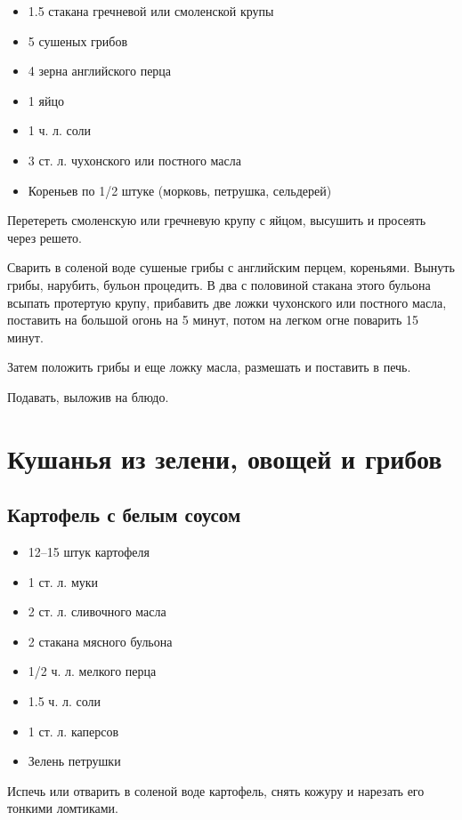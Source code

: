 \begin{itemize}
	\item 1.5 стакана гречневой или смоленской крупы 
    \item 5 сушеных грибов 
    \item 4 зерна английского перца
    \item 1 яйцо 
    \item 1 ч. л. соли 
    \item 3 ст. л. чухонского или постного масла 
    \item Кореньев по 1/2 штуке (морковь, петрушка, сельдерей)
\end{itemize}

Перетереть смоленскую или гречневую крупу с яйцом, высушить и просеять через решето.

Сварить в соленой воде сушеные грибы с английским перцем, кореньями. Вынуть грибы, нарубить, бульон процедить. В два с половиной стакана этого бульона всыпать протертую крупу, прибавить две ложки чухонского или постного масла, поставить на большой огонь на 5 минут, потом на легком огне поварить 15 минут.

Затем положить грибы и еще ложку масла, размешать и поставить в печь.

Подавать, выложив на блюдо.

\newpage
\section{Кушанья из зелени, овощей и грибов}\label{15sec:ovoschi}

\subsection{Картофель с белым соусом}

\begin{itemize}
	\item 12–15 штук картофеля 
    \item 1 ст. л. муки
    \item 2 ст. л. сливочного масла 
    \item 2 стакана мясного бульона 
    \item 1/2 ч. л. мелкого перца
    \item 1.5 ч. л. соли 
    \item 1 ст. л. каперсов 
    \item Зелень петрушки
\end{itemize}

Испечь или отварить в соленой воде картофель, снять кожуру и нарезать его тонкими ломтиками.

